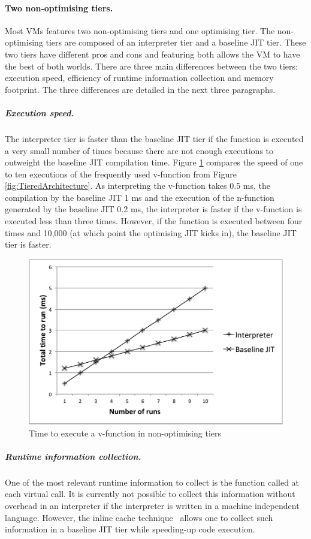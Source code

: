 \documentclass[a4paper,12pt,twoside]{../includes/ThesisStyle}
\begin{document}
\paragraph{Two non-optimising tiers.}Most VMs features two non-optimising tiers and one optimising tier. The non-optimising tiers are composed of an interpreter tier and a baseline JIT tier. These two tiers have different pros and cons and featuring both allows the VM to have the best of both worlds. There are three main differences between the two tiers: execution speed, efficiency of runtime information collection and memory footprint. The three differences are detailed in the next three paragraphs.

\subparagraph{Execution speed.} The interpreter tier is faster than the baseline JIT tier if the function is executed a very small number of times because there are not enough executions to outweight the baseline JIT compilation time. Figure \ref{fig:NonOptTierGraph} compares the speed of one to ten executions of the frequently used v-function from Figure \ref{fig:TieredArchitecture}. As interpreting the v-function takes 0.5 ms, the compilation by the baseline JIT 1 ms and the execution of the n-function generated by the baseline JIT 0.2 ms, the interpreter is faster if the v-function is executed less than three times. However, if the function is executed between four times and 10,000 (at which point the optimising JIT kicks in), the baseline JIT tier is faster.

\begin{figure}[h!]
    \begin{center}
        \includegraphics[width=0.70\linewidth]{NonOptTierGraph}
        \caption{Time to execute a v-function in non-optimising tiers}
        \label{fig:NonOptTierGraph}
    \end{center}
\end{figure}
	
	\subparagraph{Runtime information collection.} One of the most relevant runtime information to collect is the function called at each virtual call. It is currently not possible to collect this information without overhead in an interpreter if the interpreter is written in a machine independent language. However, the inline cache technique~\cite{Deut84a,Holz91a} allows one to collect such information in a baseline JIT tier while speeding-up code execution.
	
\end{document}
